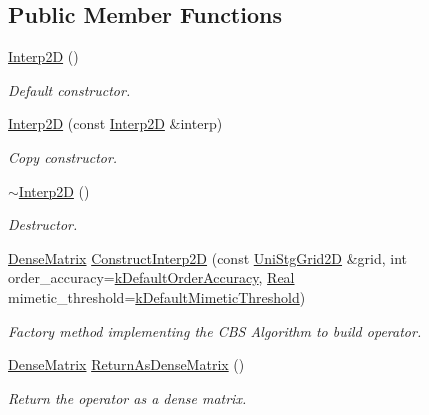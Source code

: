 \subsection*{Public Member Functions}
\begin{DoxyCompactItemize}
\item 
\hyperlink{classmtk_1_1Interp2D_a1ced84c0dbafdbe1cd3732d5a4848e10}{Interp2\+D} ()
\begin{DoxyCompactList}\small\item\em Default constructor. \end{DoxyCompactList}\item 
\hyperlink{classmtk_1_1Interp2D_a86af209e6045050e4ebc205dd43b8279}{Interp2\+D} (const \hyperlink{classmtk_1_1Interp2D}{Interp2\+D} \&interp)
\begin{DoxyCompactList}\small\item\em Copy constructor. \end{DoxyCompactList}\item 
\hyperlink{classmtk_1_1Interp2D_a037ed312b0baa2137a31984108e6907d}{$\sim$\+Interp2\+D} ()
\begin{DoxyCompactList}\small\item\em Destructor. \end{DoxyCompactList}\item 
\hyperlink{classmtk_1_1DenseMatrix}{Dense\+Matrix} \hyperlink{classmtk_1_1Interp2D_ae9a83433caa1fd62956cce0872a02fb8}{Construct\+Interp2\+D} (const \hyperlink{classmtk_1_1UniStgGrid2D}{Uni\+Stg\+Grid2\+D} \&grid, int order\+\_\+accuracy=\hyperlink{group__c01-roots_ga0d95560098eb36420511103637b6952f}{k\+Default\+Order\+Accuracy}, \hyperlink{group__c01-roots_gac080bbbf5cbb5502c9f00405f894857d}{Real} mimetic\+\_\+threshold=\hyperlink{group__c01-roots_ga35718d949bdc81a08a9cc8ebbe3478a2}{k\+Default\+Mimetic\+Threshold})
\begin{DoxyCompactList}\small\item\em Factory method implementing the C\+B\+S Algorithm to build operator. \end{DoxyCompactList}\item 
\hyperlink{classmtk_1_1DenseMatrix}{Dense\+Matrix} \hyperlink{classmtk_1_1Interp2D_a8ec771bc030c11d0a806b642387d3b32}{Return\+As\+Dense\+Matrix} ()
\begin{DoxyCompactList}\small\item\em Return the operator as a dense matrix. \end{DoxyCompactList}\end{DoxyCompactItemize}
